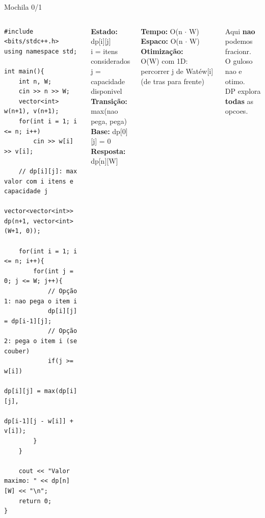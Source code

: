 \documentclass[aspectratio=169,10pt]{beamer}
\begin{document}
\begin{frame}[fragile,shrink=3]{Mochila 0/1}
  \begin{columns}[t]
      \begin{tcolorbox}[caixaCodigo]
        \begin{lstlisting}[style=cppstyle]
#include <bits/stdc++.h>
using namespace std;

int main(){
    int n, W;
    cin >> n >> W;
    vector<int> w(n+1), v(n+1);
    for(int i = 1; i <= n; i++)
        cin >> w[i] >> v[i];

    // dp[i][j]: max valor com i itens e capacidade j
    vector<vector<int>> dp(n+1, vector<int>(W+1, 0));

    for(int i = 1; i <= n; i++){
        for(int j = 0; j <= W; j++){
            // Opção 1: nao pega o item i
            dp[i][j] = dp[i-1][j];
            // Opção 2: pega o item i (se couber)
            if(j >= w[i])
                dp[i][j] = max(dp[i][j],
                    dp[i-1][j - w[i]] + v[i]);
        }
    }

    cout << "Valor maximo: " << dp[n][W] << "\n";
    return 0;
}
        \end{lstlisting}
      \end{tcolorbox}
      \begin{tcolorbox}[caixaDP,title={Estrutura}]
        \footnotesize
        \textbf{Estado:} dp[i][j]\\
        i = itens considerados\\
        j = capacidade disponivel\\[4pt]
        \textbf{Transição:}\\
        max(nao pega, pega)\\[4pt]
        \textbf{Base:} dp[0][j] = 0\\[4pt]
        \textbf{Resposta:} dp[n][W]
      \end{tcolorbox}
      \vspace{0.08cm}
      \begin{tcolorbox}[caixaAzul,title={Complexidade}]
        \footnotesize
        \textbf{Tempo:} O(n $\cdot$ W)\\
        \textbf{Espaco:} O(n $\cdot$ W)\\[3pt]
        \textbf{Otimização:}\\
        O(W) com 1D: percorrer j
        de Watéw[i] (de tras para frente)
      \end{tcolorbox}
      \vspace{0.08cm}
      \begin{tcolorbox}[caixaAmarelo,title={Diferenca do Guloso}]
        \footnotesize
        Aqui \textbf{nao} podemos fracionr.\\
        O guloso nao e otimo.\\
        DP explora \textbf{todas} as opcoes.
      \end{tcolorbox}
  \end{columns}
\end{frame}
\end{document}
